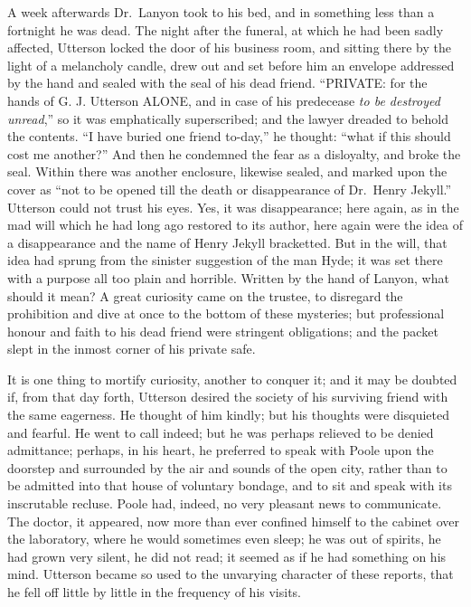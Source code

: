 \documentclass[12pt,openright]{book}
\begin{document}
A week afterwards Dr. Lanyon took to his bed, and in something less than a fortnight he was dead. The night after the funeral, at which he had been sadly affected, Utterson locked the door of his business room, and sitting there by the light of a melancholy candle, drew out and set before him an envelope addressed by the hand and sealed with the seal of his dead friend. “PRIVATE: for the hands of G. J. Utterson ALONE, and in case of his predecease \textit{to be destroyed unread},” so it was emphatically superscribed; and the lawyer dreaded to behold the contents. “I have buried one friend to-day,” he thought: “what if this should cost me another?” And then he condemned the fear as a disloyalty, and broke the seal. Within there was another enclosure, likewise sealed, and marked upon the cover as “not to be opened till the death or disappearance of Dr. Henry Jekyll.” Utterson could not trust his eyes. Yes, it was disappearance; here again, as in the mad will which he had long ago restored to its author, here again were the idea of a disappearance and the name of Henry Jekyll bracketted. But in the will, that idea had sprung from the sinister suggestion of the man Hyde; it was set there with a purpose all too plain and horrible. Written by the hand of Lanyon, what should it mean? A great curiosity came on the trustee, to disregard the prohibition and dive at once to the bottom of these mysteries; but professional honour and faith to his dead friend were stringent obligations; and the packet slept in the inmost corner of his private safe.

It is one thing to mortify curiosity, another to conquer it; and it may be doubted if, from that day forth, Utterson desired the society of his surviving friend with the same eagerness. He thought of him kindly; but his thoughts were disquieted and fearful. He went to call indeed; but he was perhaps relieved to be denied admittance; perhaps, in his heart, he preferred to speak with Poole upon the doorstep and surrounded by the air and sounds of the open city, rather than to be admitted into that house of voluntary bondage, and to sit and speak with its inscrutable recluse. Poole had, indeed, no very pleasant news to communicate. The doctor, it appeared, now more than ever confined himself to the cabinet over the laboratory, where he would sometimes even sleep; he was out of spirits, he had grown very silent, he did not read; it seemed as if he had something on his mind. Utterson became so used to the unvarying character of these reports, that he fell off little by little in the frequency of his visits.
\end{document}

